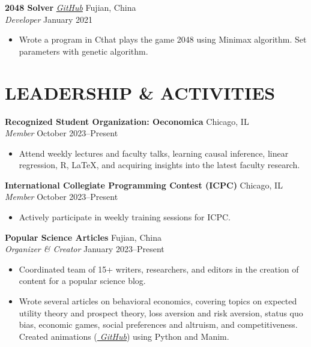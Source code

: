 \documentclass[letterpaper, 9pt]{extarticle}
\newcommand{\CPP}{C\nolinebreak\hspace{-.05em}\raisebox{.4ex}{\tiny\bf +}\nolinebreak\hspace{-.10em}\raisebox{.4ex}{\tiny\bf +}}
\begin{document}
\noindent
\textbf{2048 Solver} 
\emph{\href{https://github.com/AdenChen27/2048_solver}{\color{blue} GitHub}}
\hfill Fujian, China \\
\textit{Developer} \hfill January 2021
\begin{itemize}
    \item Wrote a program in \CPP \space that plays the game 2048 using Minimax algorithm. Set parameters with genetic algorithm.
\end{itemize}

\section*{LEADERSHIP \& ACTIVITIES}


\noindent
\textbf{Recognized Student Organization: Oeconomica} 
\hfill Chicago, IL \\
\textit{Member} \hfill October 2023--Present
\begin{itemize}
    \item Attend weekly lectures and faculty talks, learning causal inference, linear regression, R, \LaTeX, and acquiring insights into the latest faculty research.
\end{itemize}

\noindent
\textbf{International Collegiate Programming Contest (ICPC)} 
\hfill Chicago, IL \\
\textit{Member} \hfill October 2023--Present
\begin{itemize}
    \item Actively participate in weekly training sessions for ICPC.
\end{itemize}


\noindent
\textbf{Popular Science Articles} 
\hfill Fujian, China \\
\textit{Organizer \& Creator} \hfill January 2023--Present
\begin{itemize}
    \item Coordinated team of 15+ writers, researchers, and editors in the creation of content for a popular science blog.
    \item Wrote several articles on behavioral economics, covering topics on expected utility theory and prospect theory, loss aversion and risk aversion, status quo bias, economic games, social preferences and altruism, and competitiveness. Created animations (\emph{\href{https://github.com/AdenChen27/Econic}{\color{blue} GitHub}}) using Python and Manim.
\end{itemize}
\end{document}
